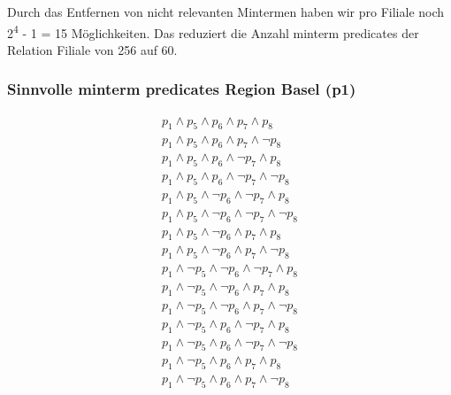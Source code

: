 \documentclass[11pt,a4paper,parskip=half]{scrartcl}
\begin{document}
Durch das Entfernen von nicht relevanten Mintermen haben wir pro Filiale noch 2\textsuperscript{4} - 1 = 15 Möglichkeiten. Das reduziert die Anzahl minterm predicates der Relation Filiale von 256 auf 60.

\subsubsection{Sinnvolle minterm predicates Region Basel (p1)}
\begin{align*}
p_1 \wedge p_5 \wedge p_6 \wedge p_7 \wedge p_8\\
p_1 \wedge p_5 \wedge p_6 \wedge p_7 \wedge \neg p_8\\
p_1 \wedge p_5 \wedge p_6 \wedge \neg p_7 \wedge p_8\\
p_1 \wedge p_5 \wedge p_6 \wedge \neg p_7 \wedge \neg p_8\\
p_1 \wedge p_5 \wedge \neg p_6 \wedge \neg p_7 \wedge p_8\\
p_1 \wedge p_5 \wedge \neg p_6 \wedge \neg p_7 \wedge \neg p_8\\
p_1 \wedge p_5 \wedge \neg p_6 \wedge  p_7 \wedge p_8\\
p_1 \wedge p_5 \wedge \neg p_6 \wedge  p_7 \wedge \neg p_8\\
p_1 \wedge \neg p_5 \wedge \neg p_6 \wedge \neg p_7 \wedge p_8\\
p_1 \wedge \neg p_5 \wedge \neg p_6 \wedge  p_7 \wedge p_8\\
p_1 \wedge \neg p_5 \wedge \neg p_6 \wedge  p_7 \wedge \neg p_8\\
p_1 \wedge \neg p_5 \wedge  p_6 \wedge \neg p_7 \wedge p_8\\
p_1 \wedge \neg p_5 \wedge  p_6 \wedge \neg p_7 \wedge \neg p_8\\
p_1 \wedge \neg p_5 \wedge  p_6 \wedge  p_7 \wedge  p_8\\
p_1 \wedge \neg p_5 \wedge  p_6 \wedge  p_7 \wedge \neg p_8\\
\end{align*}
\end{document}

